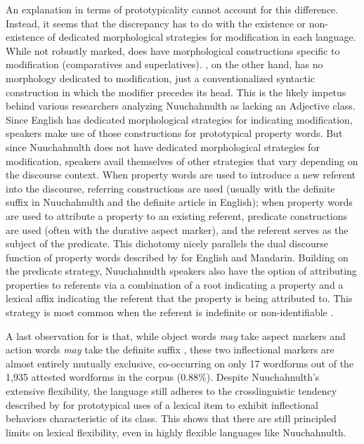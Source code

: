 An explanation in terms of prototypicality cannot account for this difference. Instead, it seems that the discrepancy has to do with the existence or non-existence of dedicated morphological strategies for modification in each language. While not robustly marked,  does have morphological constructions specific to modification (comparatives and superlatives). , on the other hand, has no morphology dedicated to modification, just a conventionalized syntactic construction in which the modifier precedes its head. This is the likely impetus behind various researchers analyzing Nuuchahnulth as lacking an Adjective class. Since English has dedicated morphological strategies for indicating modification, speakers make use of those constructions for prototypical property words. But since Nuuchahnulth does not have dedicated morphological strategies for modification, speakers avail themselves of other strategies that vary depending on the discourse context. When property words are used to introduce a new referent into the discourse, referring constructions are used (usually with the definite suffix  in Nuuchahnulth and the definite article in English); when property words are used to attribute a property to an existing referent, predicate constructions are used (often with the durative aspect marker), and the referent serves as the subject of the predicate. This dichotomy nicely parallels the dual discourse function of property words described by \textcite{Thompson1989} for English and Mandarin. Building on the predicate strategy, Nuuchahnulth speakers also have the option of attributing properties to referents via a combination of a root indicating a property and a lexical affix indicating the referent that the property is being attributed to. This strategy is most common when the referent is indefinite or non-identifiable \parencite[144]{Nakayama2001}.

A last observation for  is that, while object words \emph{may} take aspect markers and action words \emph{may} take the definite suffix , these two inflectional markers are almost entirely mutually exclusive, co-occurring on only 17 wordforms out of the 1,935 attested wordforms in the corpus (0.88\%). Despite Nuuchahnulth's extensive flexibility, the language still adheres to the crosslinguistic tendency described by \textcite{HopperThompson1984} for prototypical uses of a lexical item to exhibit inflectional behaviors characteristic of its class. This shows that there are still principled limits on lexical flexibility, even in highly flexible languages like Nuuchahnulth.

